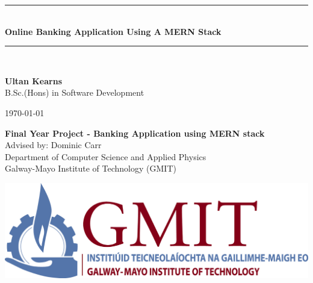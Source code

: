 \documentclass[12pt,a4paper,oneside,openany]{book}
\newcommand{\projecttitle}{Online Banking Application Using A MERN Stack}
\newcommand{\projectauthor}{Ultan Kearns}
\newcommand{\projectadvisor}{Dominic Carr}
\newcommand{\projectprogramme}{B.Sc.(Hons) in Software Development}
\newcommand{\projectdate}{\today}
\begin{document}
  \begin{titlepage}
    \begin{minipage}[t][6cm]{\textwidth}
      \centering
      \rule{\linewidth}{0.5mm} \\[0.4cm]
      { \LARGE \bfseries \projecttitle \\[0.4cm] }
      \rule{\linewidth}{0.5mm} \\[0.8cm]
    \end{minipage}

    \begin{minipage}[t][6.5cm]{\textwidth}
      \centering
      \textbf{\projectauthor}\\[0.5cm]
      \projectprogramme
    \end{minipage}

    \begin{minipage}[t][1cm]{\textwidth}
      \centering
      \textsc{\projectdate}
    \end{minipage}

    \begin{minipage}[t][3cm]{\textwidth}
      \centering
      \textbf{Final Year Project - Banking Application using MERN stack}\\[0.3cm]
      Advised by: \projectadvisor \\[0.1cm]
      Department of Computer Science and Applied Physics\\
      Galway-Mayo Institute of Technology (GMIT)
     \end{minipage}
    \begin{center}
    \includegraphics{img/gmit-logo.jpg}
    \end{center}
  \end{titlepage}
  \setcounter{page}{2}
  \tableofcontents
  
\end{document}
